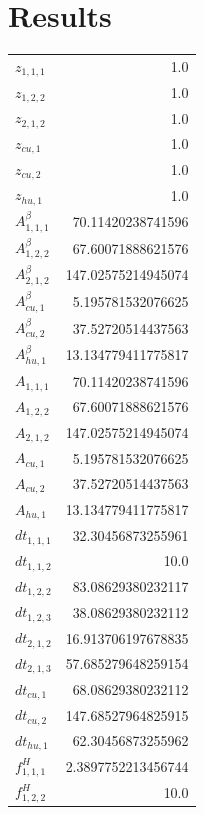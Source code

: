 \documentclass{article}%
\makeatletter
\let\mcnewpage=\newpage%
\newcommand{\TrickSupertabularIntoMulticols}{%
\renewcommand\newpage{%
\if@firstcolumn%
\hrule width\linewidth height0pt%
\columnbreak%
\else%
\mcnewpage%
\fi%
}%
}%
\makeatother
\begin{document}
\section{Results}%
\thispagestyle{plain}%
\begin{multicols*}{3}%
\TrickSupertabularIntoMulticols%
%
\begin{supertabular}{lr}%
	$z_{1,1,1}$ & 1.0 \\%
	$z_{1,2,2}$ & 1.0 \\%
	$z_{2,1,2}$ & 1.0 \\%
	$z_{cu,1}$ & 1.0 \\%
	$z_{cu,2}$ & 1.0 \\%
	$z_{hu,1}$ & 1.0 \\%
	$A_{1,1,1}^{\beta}$ & 70.11420238741596 \\%
	$A_{1,2,2}^{\beta}$ & 67.60071888621576 \\%
	$A_{2,1,2}^{\beta}$ & 147.02575214945074 \\%
	$A_{cu,1}^{\beta}$ & 5.195781532076625 \\%
	$A_{cu,2}^{\beta}$ & 37.52720514437563 \\%
	$A_{hu,1}^{\beta}$ & 13.134779411775817 \\%
	$A_{1,1,1}$ & 70.11420238741596 \\%
	$A_{1,2,2}$ & 67.60071888621576 \\%
	$A_{2,1,2}$ & 147.02575214945074 \\%
	$A_{cu,1}$ & 5.195781532076625 \\%
	$A_{cu,2}$ & 37.52720514437563 \\%
	$A_{hu,1}$ & 13.134779411775817 \\%
	$dt_{1,1,1}$ & 32.30456873255961 \\%
	$dt_{1,1,2}$ & 10.0 \\%
	$dt_{1,2,2}$ & 83.08629380232117 \\%
	$dt_{1,2,3}$ & 38.08629380232112 \\%
	$dt_{2,1,2}$ & 16.913706197678835 \\%
	$dt_{2,1,3}$ & 57.685279648259154 \\%
	$dt_{cu,1}$ & 68.08629380232112 \\%
	$dt_{cu,2}$ & 147.68527964825915 \\%
	$dt_{hu,1}$ & 62.30456873255962 \\%
	$f_{1,1,1}^{H}$ & 2.3897752213456744 \\%
	$f_{1,2,2}^{H}$ & 10.0 \\%

\end{supertabular}
\end{multicols*}
\end{document}
